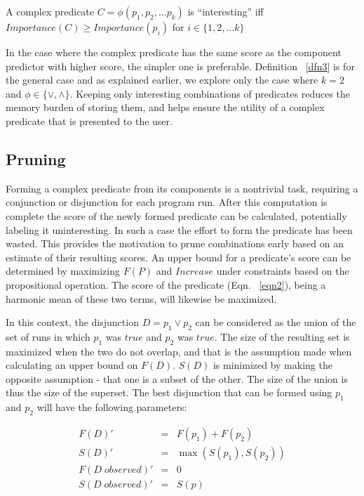 \begin{defn}
\label{dfn3}
A complex predicate $C = \phi(p_1, p_2, \ldots p_k)$ is ``interesting'' iff $Importance(C) \geq Importance(p_i)$ for $i \in \{1, 2, \ldots k\}$
\end{defn}

In the case where the complex predicate has the same score as the component predictor with higher score, the simpler one is preferable.  Definition ~\ref{dfn3} is for the general case and as explained earlier, we explore only the case where $k = 2$ and $\phi \in \{\vee, \wedge\}$.  Keeping only interesting combinations of predicates reduces the memory burden of storing them, and helps ensure the utility of a complex predicate that is presented to the user.

\subsection{Pruning}
Forming a complex predicate from its components is a nontrivial task, requiring a conjunction or disjunction for each program run.  After this computation is complete the score of the newly formed predicate can be calculated, potentially labeling it uninteresting.  In such a case the effort to form the predicate has been wasted.  This provides the motivation to prune combinations early based on an estimate of their resulting scores.  An upper bound for a predicate's score can be determined by maximizing $F(P)$ and $Increase$ under constraints based on the propositional operation.  The score of the predicate (Eqn. ~\ref{eqn2}), being a harmonic mean of these two terms, will likewise be maximized.

In this context, the disjunction $D = p_1 \vee p_2$ can be considered as the union of the set of runs in which $p_1$ was $true$ and $p_2$ was $true$.  The size of the resulting set is maximized when the two do not overlap, and that is the assumption made when calculating an upper bound on $F(D)$.  $S(D)$ is minimized by making the opposite assumption - that one is a subset of the other.  The size of the union is thus the size of the superset.  The best disjunction that can be formed using $p_1$ and $p_2$ will have the following parameters:

\begin{eqnarray}
 \nonumber %
  F(D)' &=&  F(p_1) + F(p_2) \\
 \nonumber
  S(D)' &=&  \max(S(p_1),S(p_2)) \\
 \nonumber
  F(D\;observed)' &=& 0 \\
 \nonumber
  S(D\;observed)' &=& S(p)
\end{eqnarray}


